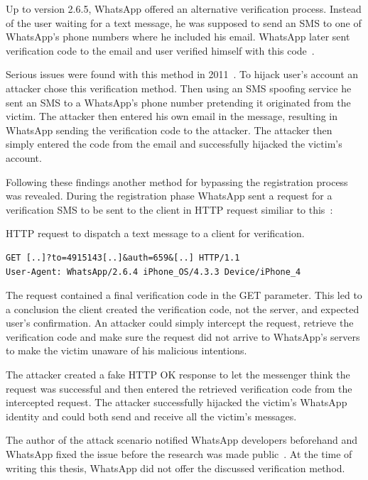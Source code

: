 \documentclass[thesis=M,english]{FITthesis}[2012/10/20]
\begin{document}
Up to version 2.6.5, WhatsApp offered an alternative verification process. Instead of the user waiting for a text message, he was supposed to send an SMS to one of WhatsApp's phone numbers where he included his email. WhatsApp later sent verification code to the email and user verified himself with this code~\cite{whatsapp-shootingthemsg}.

Serious issues were found with this method in 2011~\cite{whatsapp-hijack1}. To hijack user's account an attacker chose this verification method. Then using an SMS spoofing service he sent an SMS to a WhatsApp's phone number pretending it originated from the victim. The attacker then entered his own email in the message, resulting in WhatsApp sending the verification code to the attacker. The attacker then simply entered the code from the email and successfully hijacked the victim's account.

Following these findings another method for bypassing the registration process was revealed. During the registration phase WhatsApp sent a request for a verification SMS to be sent to the client in HTTP request similiar to this~\cite{whatsapp-shootingthemsg}:

\begin{listing}[htb]
\caption{HTTP request to dispatch a text message to a client for verification.}
\begin{verbatim}
GET [..]?to=4915143[..]&auth=659&[..] HTTP/1.1
User-Agent: WhatsApp/2.6.4 iPhone_OS/4.3.3 Device/iPhone_4
\end{verbatim}
\label{lst:status-whatsapp-http}
\end{listing}

The request contained a final verification code in the GET parameter. This led to a conclusion the client created the verification code, not the server, and expected user's confirmation. An attacker could simply intercept the request, retrieve the verification code and make sure the request did not arrive to WhatsApp's servers to make the victim unaware of his malicious intentions.

The attacker created a fake HTTP OK response to let the messenger think the request was successful and then entered the retrieved verification code from the intercepted request. The attacker successfully hijacked the victim's WhatsApp identity and could both send and receive all the victim's messages.

The author of the attack scenario notified WhatsApp developers beforehand and WhatsApp fixed the issue before the research was made public~\cite{whatsapp-shootingthemsg}. At the time of writing this thesis, WhatsApp did not offer the discussed verification method.
\end{document}
